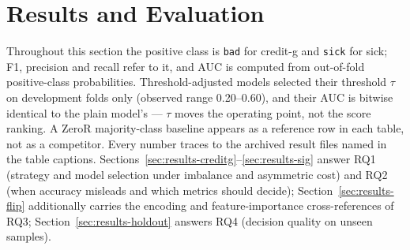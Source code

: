 
\section{Results and Evaluation}
\label{sec:results}

Throughout this section the positive class is \texttt{bad} for credit-g and \texttt{sick} for sick; F1, precision and recall refer to it, and AUC is computed from out-of-fold positive-class probabilities. Threshold-adjusted models selected their threshold $\tau$ on development folds only (observed range 0.20--0.60), and their AUC is bitwise identical to the plain model's --- $\tau$ moves the operating point, not the score ranking. A ZeroR majority-class baseline appears as a reference row in each table, not as a competitor. Every number traces to the archived result files named in the table captions. Sections~\ref{sec:results-creditg}--\ref{sec:results-sig} answer RQ1 (strategy and model selection under imbalance and asymmetric cost) and RQ2 (when accuracy misleads and which metrics should decide); Section~\ref{sec:results-flip} additionally carries the encoding and feature-importance cross-references of RQ3; Section~\ref{sec:results-holdout} answers RQ4 (decision quality on unseen samples).


